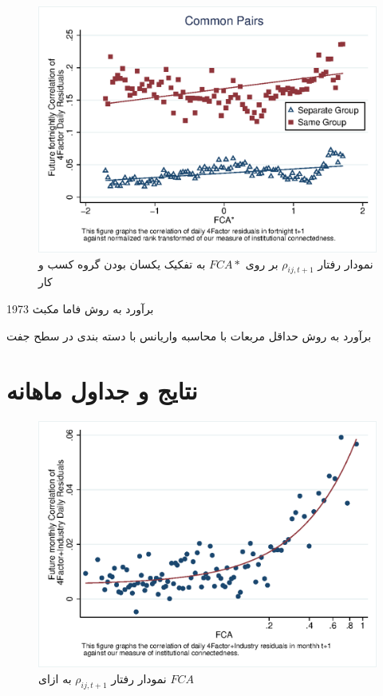 \documentclass[12pt]{article}
\begin{document}
\begin{appendices}
  
  \begin{figure}[htbp]
   \centering
   \includegraphics[width=.7\linewidth]{wcorr4g.eps}
     \caption{نمودار رفتار  
         $ \rho_{ij,{t+1}} $
           بر روی 
     $ FCA* $ 
     به تفکیک یکسان بودن گروه کسب و کار}
     \label{f3}
   \end{figure}



\begin{table}[htbp]
\centering
\begin{LTR}
\lr{
   \resizebox{\textwidth}{!}{
   
   }
   }
\end{LTR}
\caption{برآورد به روش فاما مکبث 1973}
\label{t18}
\end{table}

 \begin{table}[htbp]
 \centering
 \begin{LTR}
 \lr{
    \resizebox{\textwidth}{!}{
    
    }
    }
 \end{LTR}
 \caption{برآورد به روش حداقل مربعات با محاسبه واریانس با دسته بندی در سطح جفت}
 \label{t19}
 \end{table}
\FloatBarrier
 
 
 

 \section{نتایج و جداول ماهانه}
 \label{sa.2}
      
           \begin{figure}[htbp]
           \centering
           \includegraphics[width=.7\linewidth]{mcorr50.eps}
             \caption{نمودار رفتار  
                 $ \rho_{ij,{t+1}} $
                 به ازای 
             $ FCA $ 
             }
             \label{f9}
           \end{figure} 
       

\end{appendices}
\end{document}
